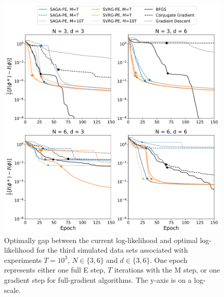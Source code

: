 \documentclass[12pt]{article}
\begin{document}
\begin{figure}[H]
    \centering
    \includegraphics[width=6.5in]{../plt/log-like_v_epoch_T-1000-002.png}
    \caption{Optimally gap between the current log-likelihood and optimal log-likelihood for the third simulated data sets associated with experiments $T=10^{3}$, $N \in \{3,6\}$ and $d \in \{3,6\}$. One epoch represents either one full E step, $T$ iterations with the M step, or one gradient step for full-gradient algorithms. The y-axis is on a log-scale.}
\end{figure}
%
\end{document}
